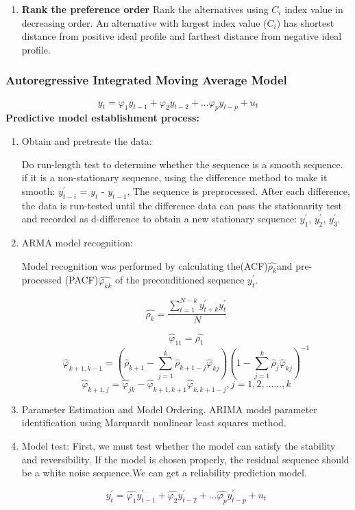 \documentclass{mcmthesis}
\begin{document}
\begin{enumerate}
          \item \textbf{Rank the preference order}
        Rank the alternatives using $C_i$ index value in decreasing order. An alternative with largest index value ($C_i$) has shortest distance from positive ideal profile and farthest distance from negative ideal profile.

        \end{enumerate}
        
        \subsubsection{Autoregressive Integrated Moving Average Model}
        $$y_{t}=\varphi_{1}y_{t-1}+\varphi_{2}y_{t-2}+...\varphi_{p}y_{t-p}+u_{t}$$
        \textbf{Predictive model establishment process:}
        \begin{enumerate}
          \item Obtain and pretreate the data:

           Do run-length test to determine whether the sequence is a smooth sequence. if it is a non-stationary sequence, using the difference method to make it smooth: $y_{t-i}^{'}$ = $y_{t}$ - $y_{t-1}$, The sequence is preprocessed. After each difference, the data is run-tested until the difference data can pass the stationarity test and recorded as d-difference to obtain a new stationary sequence: $y_{1}^{'}$, $y_{2}^{'}$, $y_{3}^{'}$.

          \item ARMA model recognition:

          Model recognition was performed by calculating the(ACF)$\hat{\rho_{k}}$and pre-processed (PACF)$\hat{\varphi_{kk}}$ of the preconditioned sequence $y_{t}^{'}$.

          $$\hat{\rho_{k}} = \frac{\sum_{t=1}^{N-k}y_{t+k}^{'}y_{t}^{'}}{N}$$

          $$\hat{\varphi}_{11} = \hat{\rho_{1}}$$
          $$\hat{\varphi}_{k+1,k-1} = (\hat{\rho}_{k+1}-\sum_{j=1}^{k}\hat{\rho}_{k+1-j}\hat{\varphi}_{kj})(1-\sum_{j=1}^{k}\hat{\rho}_{j}\hat{\varphi}_{kj})^{-1}$$
          $$\hat{\varphi}_{k+1,j} = \hat{\varphi}_{jk} - \hat{\varphi}_{k+1,k+1}\hat{\varphi}_{k,k+1-j},j = 1, 2, ......, k $$

          \item Parameter Estimation and Model Ordering. ARIMA model parameter identification using Marquardt nonlinear least squares method.

          \item Model test:
          First, we must test whether the model can satisfy the stability and reversibility. If the model is chosen properly, the residual sequence should be a white noise sequence.We can get a reliability prediction model.

          $$y_{t}^{'}=\hat{\varphi_{1}}y_{t-1}^{'}+\hat{\varphi_{2}}y_{t-2}^{'}+...\hat{\varphi_{p}}y_{t-p}^{'}+u_{t}$$


        \end{enumerate}
\end{document}
